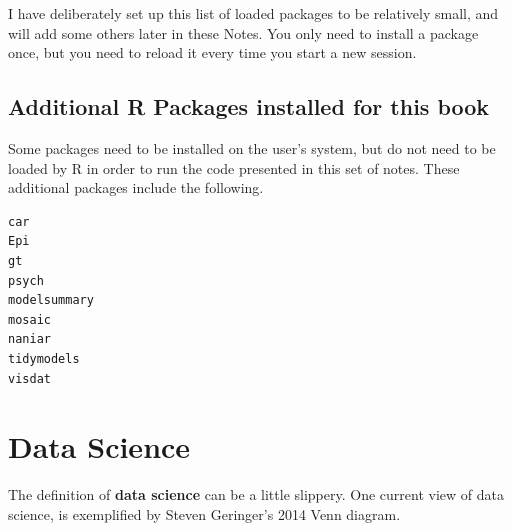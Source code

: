 \documentclass[
]{book}
\newenvironment{Shaded}{\begin{snugshade}}{\end{snugshade}}
\newcommand{\CommentTok}[1]{\textcolor[rgb]{0.56,0.35,0.01}{\textit{#1}}}
\newcommand{\DataTypeTok}[1]{\textcolor[rgb]{0.13,0.29,0.53}{#1}}
\newcommand{\KeywordTok}[1]{\textcolor[rgb]{0.13,0.29,0.53}{\textbf{#1}}}
\newcommand{\NormalTok}[1]{#1}
\newcommand{\OperatorTok}[1]{\textcolor[rgb]{0.81,0.36,0.00}{\textbf{#1}}}
\newcommand{\OtherTok}[1]{\textcolor[rgb]{0.56,0.35,0.01}{#1}}
\begin{document}
\begin{Shaded}
\end{Shaded}

I have deliberately set up this list of loaded packages to be relatively small, and will add some others later in these Notes. You only need to install a package once, but you need to reload it every time you start a new session.

\hypertarget{additional-r-packages-installed-for-this-book}{%
\section*{Additional R Packages installed for this book}\label{additional-r-packages-installed-for-this-book}}

Some packages need to be installed on the user's system, but do not need to be loaded by R in order to run the code presented in this set of notes. These additional packages include the following.

\begin{verbatim}
car
Epi
gt
psych
modelsummary
mosaic
naniar
tidymodels
visdat
\end{verbatim}

\hypertarget{data-science}{%
\chapter{Data Science}\label{data-science}}

The definition of \textbf{data science} can be a little slippery. One current view of data science, is exemplified by Steven Geringer's 2014 Venn diagram.
\end{document}
